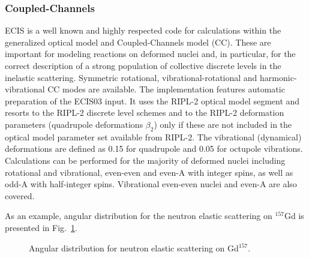 \documentclass[twocolumn,amsmath,amssymb,10pt,groupedaddress,a4paper]{revtex4}
\begin{document}
\subsubsection{Coupled-Channels}
ECIS \cite{ECIS} is a well known and highly respected code for calculations
within the generalized optical model and Coupled-Channels model (CC).
These are important for modeling reactions on deformed nuclei and,
in particular, for the correct description of a strong population
of collective discrete levels in the inelastic scattering.  Symmetric
rotational, vibrational-rotational and harmonic-vibrational CC modes
are available. The implementation features automatic preparation of
the ECIS03 input. It uses the RIPL-2 \cite{RIPL2} optical
model segment and resorts to the RIPL-2 discrete level schemes and
to the RIPL-2 deformation parameters (quadrupole deformations
$\beta _{2}$) only if these are not included in the optical model
parameter set available from RIPL-2. The
vibrational (dynamical) deformations are defined
 as 0.15 for quadrupole and 0.05 for octupole vibrations.
Calculations can be performed for the majority of deformed nuclei
including rotational and vibrational, even-even and even-A with integer
spins, as well as odd-A with half-integer spins. Vibrational even-even
nuclei and even-A are also covered.

As an example, angular distribution for the neutron elastic scattering on $^{157}$Gd
is presented in Fig.~\ref{njoygd157}.
\begin{figure}[htbp]
\caption{Angular distribution for neutron elastic scattering on Gd$^{157}$.}
\label{njoygd157}
\end{figure}
\end{document}
